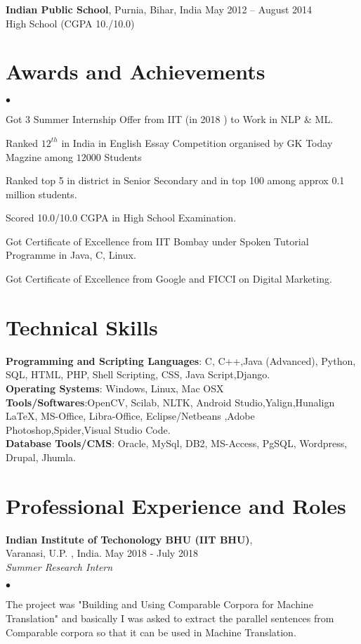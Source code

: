 \documentclass[margin,line]{res}
\newenvironment{list2}{
  \begin{list}{$\bullet$}{%
      \setlength{\itemsep}{0in}
      \setlength{\parsep}{0in} \setlength{\parskip}{0in}
      \setlength{\topsep}{0in} \setlength{\partopsep}{0in}
      \setlength{\leftmargin}{0.2in}}}{\end{list}}
\begin{document}
\begin{resume}
{\bf Indian Public School}, Purnia, Bihar, India \hfill 
May 2012 -- August 2014\\
High School \hfill(CGPA 10./10.0)

\section{\sc Awards and Achievements}
\begin{list2}
\item Got 3 Summer Internship Offer from IIT (in 2018 ) to Work in NLP \& ML.
\item Ranked $12^{th}$ in India in English Essay Competition organised by GK Today Magzine among $12000$ Students\\
\item Ranked top 5 in district in Senior Secondary and in top 100 among approx 0.1 million students.
\item Scored 10.0/10.0 CGPA in High School Examination.
\item Got Certificate of Excellence from IIT Bombay under Spoken Tutorial Programme in Java, C, Linux.
\item Got Certificate of Excellence from Google and FICCI on Digital Marketing.

\end{list2}

\section{\sc Technical Skills}
{\bf Programming and Scripting Languages}:  C, C++,Java (Advanced), Python, SQL, HTML, PHP, Shell Scripting, CSS, Java Script,Django. \\
{\bf Operating Systems}: Windows, Linux, Mac OSX\\
{\bf Tools/Softwares}:OpenCV, Scilab, NLTK, Android Studio,Yalign,Hunalign \LaTeX, MS-Office, Libra-Office, Eclipse/Netbeans ,Adobe Photoshop,Spider,Visual Studio Code. \\
{\bf Database Tools/CMS}: Oracle, MySql, DB2, MS-Access, PgSQL, Wordpress, Drupal, Jhumla.
 
\section{\sc Professional Experience and Roles}
{\bf Indian Institute of Techonology BHU (IIT BHU)},\\ Varanasi, U.P. , India. \hfill{May 2018 - July 2018}\\
{\em Summer Research Intern}
\begin{list2} %
\item The project was "Building and Using Comparable Corpora for Machine Translation" and basically I was asked to extract the parallel sentences from Comparable corpora so that it can be used in Machine Translation.  \\


\end{list2}
\end{resume}
\end{document}
